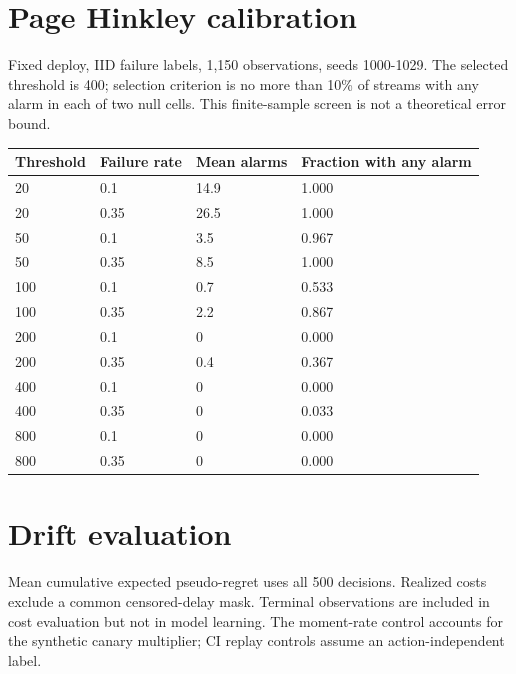 \documentclass[
  10pt,
]{article}
\begin{document}
\section{Page Hinkley calibration}\label{page-hinkley-calibration}

Fixed deploy, IID failure labels, 1,150 observations, seeds 1000-1029.
The selected threshold is 400; selection criterion is no more than 10\%
of streams with any alarm in each of two null cells. This finite-sample
screen is not a theoretical error bound.

\par\medskip\noindent\begin{minipage}{\linewidth}\centering
\begin{tabular}{@{}llll@{}}
\toprule\noalign{}
Threshold & Failure rate & Mean alarms & Fraction with any alarm \\
\midrule\noalign{}
20 & 0.1 & 14.9 & 1.000 \\
20 & 0.35 & 26.5 & 1.000 \\
50 & 0.1 & 3.5 & 0.967 \\
50 & 0.35 & 8.5 & 1.000 \\
100 & 0.1 & 0.7 & 0.533 \\
100 & 0.35 & 2.2 & 0.867 \\
200 & 0.1 & 0 & 0.000 \\
200 & 0.35 & 0.4 & 0.367 \\
400 & 0.1 & 0 & 0.000 \\
400 & 0.35 & 0 & 0.033 \\
800 & 0.1 & 0 & 0.000 \\
800 & 0.35 & 0 & 0.000 \\
\bottomrule
\end{tabular}
\end{minipage}\par\medskip

\section{Drift evaluation}\label{drift-evaluation}

Mean cumulative expected pseudo-regret uses all 500 decisions. Realized
costs exclude a common censored-delay mask. Terminal observations are
included in cost evaluation but not in model learning. The moment-rate
control accounts for the synthetic canary multiplier; CI replay controls
assume an action-independent label.
\end{document}

